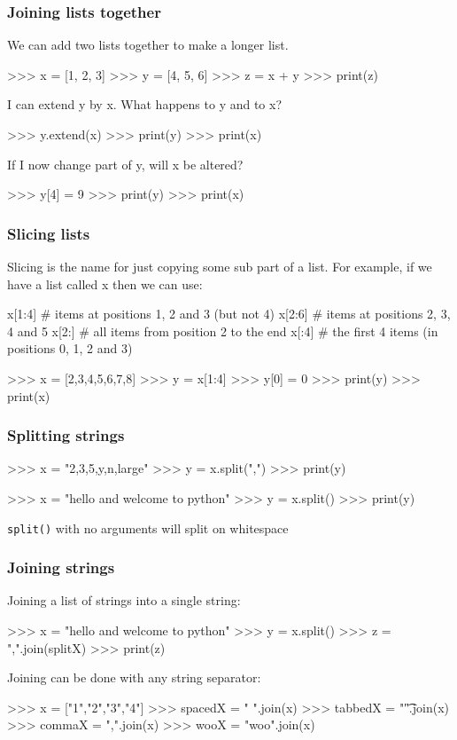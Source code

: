 \documentclass{beamer}
\begin{document}
\begin{frame}[fragile]
\frametitle{Joining lists together}
We can add two lists together to make a longer list.
\begin{code}
>>> x = [1, 2, 3]
>>> y = [4, 5, 6]
>>> z = x + y
>>> print(z)
\end{code}
 I can extend y by x. What happens to y and to x?
\begin{code}
>>> y.extend(x)
>>> print(y)
>>> print(x)
\end{code}
 If I now change part of y, will x be altered?
\begin{code}
>>> y[4] = 9
>>> print(y)
>>> print(x)
\end{code}
\end{frame}

\begin{frame}[fragile]
\frametitle{Slicing lists}
Slicing is the name for just copying some sub part of a list.
For example, if we have a list called x then we can use:
\begin{code}
x[1:4] # items at positions 1, 2 and 3 (but not 4)
x[2:6] # items at positions 2, 3, 4 and 5
x[2:] # all items from position 2 to the end 
x[:4] # the first 4 items (in positions 0, 1, 2 and 3)
\end{code}

\begin{code}
>>> x = [2,3,4,5,6,7,8]
>>> y = x[1:4]
>>> y[0] = 0
>>> print(y)
>>> print(x)
\end{code}
\end{frame}

\begin{frame}[fragile]
\frametitle{Splitting strings}
\begin{code}
>>> x = "2,3,5,y,n,large"
>>> y = x.split(",")
>>> print(y)

>>> x = "hello and welcome to python"
>>> y = x.split()
>>> print(y)
\end{code}

\texttt{split()} with no arguments will split on whitespace
\end{frame}


\begin{frame}[fragile]
\frametitle{Joining strings}
Joining a list of strings into a single string:
\begin{code}
>>> x = "hello and welcome to python"
>>> y = x.split()
>>> z = ",".join(splitX)
>>> print(z)
\end{code}

Joining can be done with any string separator:
\begin{code}
>>> x = ["1","2","3","4"]
>>> spacedX = " ".join(x)
>>> tabbedX = "\t".join(x)
>>> commaX = ",".join(x)
>>> wooX = "woo".join(x)
\end{code}
\end{frame}
\end{document}
